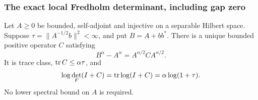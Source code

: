 \subsubsection{The exact local Fredholm determinant, including gap zero}
\begin{lemma}\label{sharp:lem:fredholm}
Let $A\ge0$ be bounded, self-adjoint and injective on a separable Hilbert
space. Suppose $\tau=\|A^{-1/2}b\|^2<\infty$, and put $B=A+bb^*$.
There is a unique bounded positive operator $C$ satisfying
\[
 B^\alpha-A^\alpha=A^{\alpha/2}CA^{\alpha/2}.
\]
It is trace class, $\operatorname{tr} C\le\alpha\tau$, and
\begin{equation}\label{sharp:eq:fredholm}
 \log\det_F(I+C)=\operatorname{tr}\log(I+C)=\alpha\log(1+\tau).
\end{equation}
No lower spectral bound on $A$ is required.
\end{lemma}

